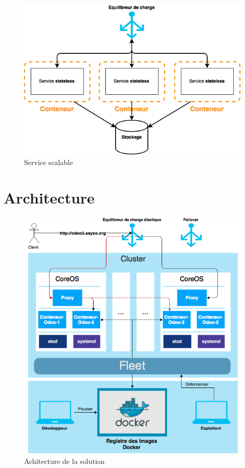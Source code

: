 \begin{onehalfspace}
\begin{figure}[H]
\centering
\includegraphics [scale=0.5]{chapitre4/assets/stateless}
\caption{Service scalable}
\label{fig:scalable}
\end{figure}


\section{Architecture}

\begin{figure}[H]
\centering
\includegraphics [scale=0.7]{chapitre4/assets/architecture}
\caption{Achitecture de la solution}
\label{fig:}
\end{figure}


\end{onehalfspace}
